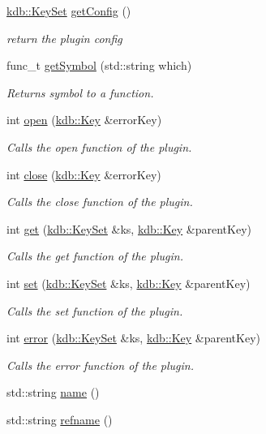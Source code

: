 \begin{DoxyCompactItemize}
\hyperlink{classkdb_1_1KeySet}{kdb\-::\-Key\-Set} \hyperlink{classkdb_1_1tools_1_1Plugin_af3004444f5ef05dc8106646ff2b95694}{get\-Config} ()
\begin{DoxyCompactList}\small\item\em return the plugin config \end{DoxyCompactList}\item 
func\-\_\-t \hyperlink{classkdb_1_1tools_1_1Plugin_aca31140802ab463d5bddd95dee73194d}{get\-Symbol} (std\-::string which)
\begin{DoxyCompactList}\small\item\em Returns symbol to a function. \end{DoxyCompactList}\item 
int \hyperlink{classkdb_1_1tools_1_1Plugin_a680a490123b5290441d76ef2c1e3f1fa}{open} (\hyperlink{classkdb_1_1Key}{kdb\-::\-Key} \&error\-Key)
\begin{DoxyCompactList}\small\item\em Calls the open function of the plugin. \end{DoxyCompactList}\item 
int \hyperlink{classkdb_1_1tools_1_1Plugin_a40b5fd413f3f6da735680ed8d7c8a6a2}{close} (\hyperlink{classkdb_1_1Key}{kdb\-::\-Key} \&error\-Key)
\begin{DoxyCompactList}\small\item\em Calls the close function of the plugin. \end{DoxyCompactList}\item 
int \hyperlink{classkdb_1_1tools_1_1Plugin_a2aa6ff55f9cf81a59d2a8d271fe68e0f}{get} (\hyperlink{classkdb_1_1KeySet}{kdb\-::\-Key\-Set} \&ks, \hyperlink{classkdb_1_1Key}{kdb\-::\-Key} \&parent\-Key)
\begin{DoxyCompactList}\small\item\em Calls the get function of the plugin. \end{DoxyCompactList}\item 
int \hyperlink{classkdb_1_1tools_1_1Plugin_abf84d512b48f6fa1b89636217537cde0}{set} (\hyperlink{classkdb_1_1KeySet}{kdb\-::\-Key\-Set} \&ks, \hyperlink{classkdb_1_1Key}{kdb\-::\-Key} \&parent\-Key)
\begin{DoxyCompactList}\small\item\em Calls the set function of the plugin. \end{DoxyCompactList}\item 
int \hyperlink{classkdb_1_1tools_1_1Plugin_a8ec348b49a34ef17fda64cb289b8cf64}{error} (\hyperlink{classkdb_1_1KeySet}{kdb\-::\-Key\-Set} \&ks, \hyperlink{classkdb_1_1Key}{kdb\-::\-Key} \&parent\-Key)
\begin{DoxyCompactList}\small\item\em Calls the error function of the plugin. \end{DoxyCompactList}\item 
std\-::string \hyperlink{classkdb_1_1tools_1_1Plugin_ae4b82f943d0cdb0dd355924aa3201d6f}{name} ()
\item 
std\-::string \hyperlink{classkdb_1_1tools_1_1Plugin_af2fa892b6a8861419b1c1c2b3d39ed1e}{refname} ()
\end{DoxyCompactItemize}
